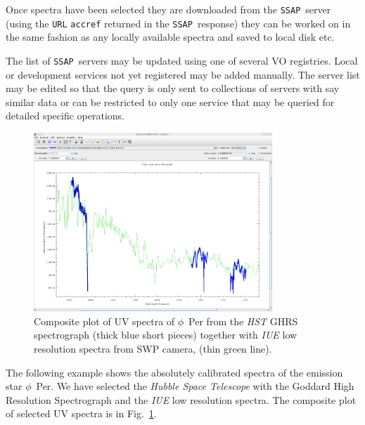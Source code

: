 \documentclass[final,authoryear,5p,times,twocolumn]{elsarticle}
\newcommand{\ssap}{\texttt{SSAP}}
\begin{document}
Once spectra have been selected they are downloaded from the \ssap\ server
(using the \texttt{URL} \texttt{accref} returned in the \ssap\ response) they
can be worked on in the same fashion as any locally available spectra and saved
to local disk etc.

The list of \ssap\ servers may be updated using one of several VO registries.
Local or development services not yet registered may be added manually. The
server list may be edited so that the query is only sent to collections of
servers with say similar data or can be restricted to only one service that may
be queried for detailed specific operations.

\begin{figure}[th]
\begin{center}
\includegraphics[width=0.8\textwidth]{iuehst2.pdf}
\caption{Composite plot of UV spectra of $\phi$~Per from the \emph{HST} GHRS
spectrograph (thick blue short pieces) together with \emph{IUE} low resolution
spectra from SWP camera, (thin green line).}
\label{fig:iuehst2}
\end{center}
\end{figure}

The following example shows the absolutely calibrated spectra of the emission
star $\phi$~Per. We have selected the \emph{Hubble Space Telescope} with the
Goddard High Resolution Spectrograph and the \emph{IUE} low resolution spectra.
The composite plot of selected  UV spectra is in Fig.~\ref{fig:iuehst2}.
\end{document}
